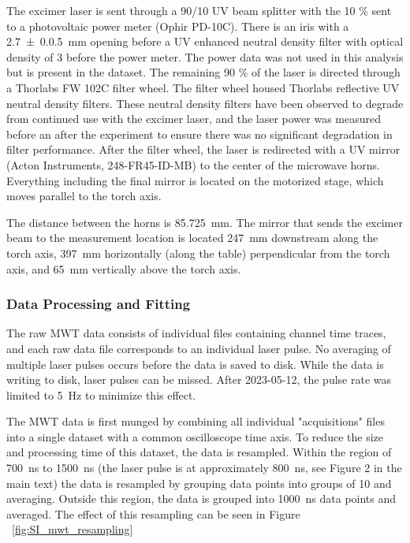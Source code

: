 The excimer laser is sent through a 90/10 UV beam splitter with the 10 \% sent to a photovoltaic power meter (Ophir PD-10C). There is an iris with a \SI{2.7(0.05)}{\milli\meter}  opening before a UV enhanced neutral density filter with optical density of 3 before the power meter. The power data was not used in this analysis but is present in the dataset. The remaining 90 \% of the laser is directed through a Thorlabs FW 102C filter wheel. The filter wheel housed Thorlabs reflective UV neutral density filters. These neutral density filters have been observed to degrade from continued use with the excimer laser, and the laser power was measured before an after the experiment to ensure there was no significant degradation in filter performance. After the filter wheel, the laser is redirected with a UV mirror (Acton Instruments, 248-FR45-ID-MB) to the center of the microwave horns. Everything including the final mirror is located on the motorized stage, which moves parallel to the torch axis. 

The distance between the horns is \SI{85.725}{\milli\meter}. The mirror that sends the excimer beam to the measurement location is located \SI{247}{\milli\meter} downstream along the torch axis, \SI{397}{\milli\meter} horizontally (along the table) perpendicular from the torch axis, and \SI{65}{\milli\meter} vertically above the torch axis. 


\subsubsection{Data Processing and Fitting}

The raw MWT data consists of individual files containing channel time traces, and each raw data file corresponds to an individual laser pulse. No averaging of multiple laser pulses occurs before the data is saved to disk. While the data is writing to disk, laser pulses can be missed. After 2023-05-12, the pulse rate was limited to \SI{5}{\hertz} to minimize this effect. 

The MWT data is first munged by combining all individual "acquisitions" files into a single dataset with a common oscilloscope time axis. To reduce the size and processing time of this dataset, the data is resampled. Within the region of \SI{700}{\nano\second} to \SI{1500}{\nano\second} (the laser pulse is at approximately \SI{800}{\nano\second}, see Figure 2 in the main text) the data is resampled by grouping data points into groups of 10 and averaging. Outside this region, the data is grouped into \SI{1000}{\nano\second} data points and averaged. The effect of this resampling can be seen in Figure \ \ref{fig:SI_mwt_resampling}

